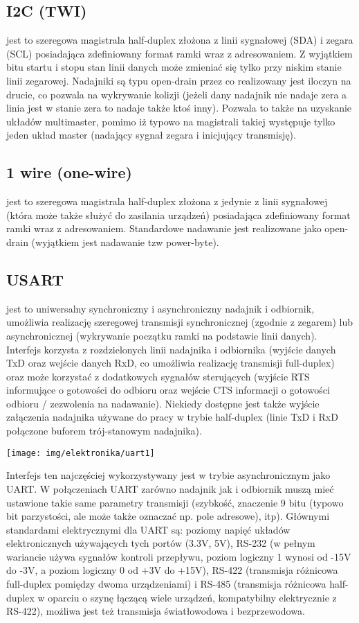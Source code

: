 \subsection{I2C (TWI)}
    jest to szeregowa magistrala half-duplex złożona z linii sygnałowej (SDA) i zegara (SCL) posiadająca zdefiniowany format ramki wraz z adresowaniem. Z wyjątkiem bitu startu i stopu stan linii danych może zmieniać się tylko przy niskim stanie linii zegarowej.
    Nadajniki są typu open-drain przez co realizowany jest iloczyn na drucie, co pozwala na wykrywanie kolizji (jeżeli dany nadajnik nie nadaje zera a linia jest w stanie zera to nadaje także ktoś inny). Pozwala to także na uzyskanie układów multimaster, pomimo iż typowo na magistrali takiej występuje tylko jeden układ master (nadający sygnał zegara i inicjujący transmisję). 

\subsection{1 wire (one-wire)}
    jest to szeregowa magistrala half-duplex złożona z jedynie z linii sygnałowej (która może także służyć do zasilania urządzeń) posiadająca zdefiniowany format ramki wraz z adresowaniem. Standardowe nadawanie jest realizowane jako open-drain (wyjątkiem jest nadawanie tzw power-byte). 

\subsection{USART}
    jest to uniwersalny synchroniczny i asynchroniczny nadajnik i odbiornik, umożliwia realizację szeregowej transmisji synchronicznej (zgodnie z zegarem) lub asynchronicznej (wykrywanie początku ramki na podstawie linii danych). Interfejs korzysta z rozdzielonych linii nadajnika i odbiornika (wyjście danych TxD oraz wejście danych RxD, co umożliwia realizację transmisji full-duplex) oraz może korzystać z dodatkowych sygnałów sterujących (wyjście RTS informujące o gotowości do odbioru oraz wejście CTS informacji o gotowości odbioru / zezwolenia na nadawanie). Niekiedy dostępne jest także wyjście załączenia nadajnika używane do pracy w trybie half-duplex (linie TxD i RxD połączone buforem trój-stanowym nadajnika).

    \begin{center} \texttt{[image: img/elektronika/uart1]} \end{center}
    Interfejs ten najczęściej wykorzystywany jest w trybie asynchronicznym jako UART. W połączeniach UART zarówno nadajnik jak i odbiornik muszą mieć ustawione takie same parametry transmisji (szybkość, znaczenie 9 bitu (typowo bit parzystości, ale może także oznaczać np. pole adresowe), itp).
    Głównymi standardami elektrycznymi dla UART są: poziomy napięć układów elektronicznych używających tych portów (3.3V, 5V), RS-232 (w pełnym wariancie używa sygnałów kontroli przepływu, poziom logiczny 1 wynosi od -15V do -3V, a poziom logiczny 0 od +3V do +15V), RS-422 (transmisja różnicowa full-duplex pomiędzy dwoma urządzeniami) i RS-485 (transmisja różnicowa half-duplex w oparciu o szynę łączącą wiele urządzeń, kompatybilny elektrycznie z RS-422), możliwa jest też transmisja światłowodowa i bezprzewodowa.

